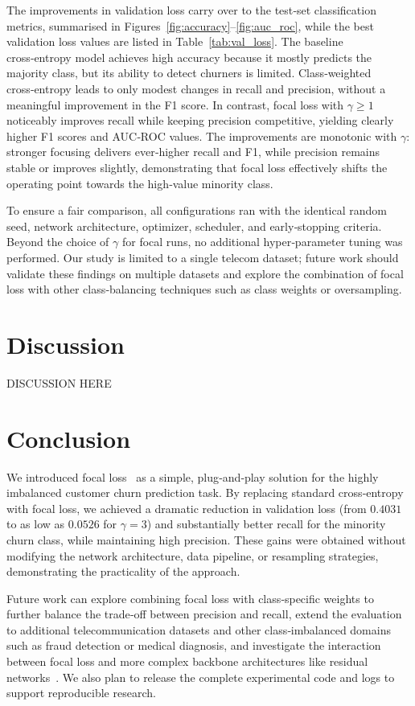 \documentclass[11pt,a4paper]{article}
\begin{document}

The improvements in validation loss carry over to the test‑set classification metrics, summarised in Figures~\ref{fig:accuracy}--\ref{fig:auc_roc}, while the best validation loss values are listed in Table~\ref{tab:val_loss}.
The baseline cross‑entropy model achieves high accuracy because it mostly predicts the majority class, but its ability to detect churners is limited.
Class‑weighted cross‑entropy leads to only modest changes in recall and precision, without a meaningful improvement in the F1 score.
In contrast, focal loss with $\gamma \ge 1$ noticeably improves recall while keeping precision competitive, yielding clearly higher F1 scores and AUC‑ROC values.
The improvements are monotonic with $\gamma$: stronger focusing delivers ever‑higher recall and F1, while precision remains stable or improves slightly, demonstrating that focal loss effectively shifts the operating point towards the high‑value minority class.

To ensure a fair comparison, all configurations ran with the identical random seed, network architecture, optimizer, scheduler, and early‑stopping criteria.
Beyond the choice of $\gamma$ for focal runs, no additional hyper‑parameter tuning was performed.
Our study is limited to a single telecom dataset; future work should validate these findings on multiple datasets and explore the combination of focal loss with other class‑balancing techniques such as class weights or oversampling.

\section{Discussion}
\label{sec:discussion}
DISCUSSION HERE

\section{Conclusion}
\label{sec:conclusion}
We introduced focal loss~\cite{lin2017focal} as a simple, plug‑and‑play solution for the highly imbalanced customer churn prediction task. By replacing standard cross‑entropy with focal loss, we achieved a dramatic reduction in validation loss (from $0.4031$ to as low as $0.0526$ for $\gamma=3$) and substantially better recall for the minority churn class, while maintaining high precision. These gains were obtained without modifying the network architecture, data pipeline, or resampling strategies, demonstrating the practicality of the approach.

Future work can explore combining focal loss with class‑specific weights to further balance the trade‑off between precision and recall, extend the evaluation to additional telecommunication datasets and other class‑imbalanced domains such as fraud detection or medical diagnosis, and investigate the interaction between focal loss and more complex backbone architectures like residual networks~\cite{he2016deep}. We also plan to release the complete experimental code and logs to support reproducible research.

\nocite{*}


\end{document}
